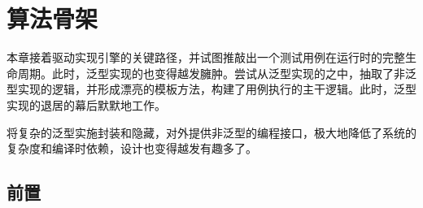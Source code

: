 \begin{savequote}[45mm]
\end{savequote}

\chapter{算法骨架} 
\label{ch:skeleton}

\begin{content}

本章接着驱动实现引擎的关键路径，并试图推敲出一个测试用例在运行时的完整生命周期。此时，泛型实现的也变得越发臃肿。尝试从泛型实现的之中，抽取了非泛型实现的逻辑，并形成漂亮的模板方法，构建了用例执行的主干逻辑。此时，泛型实现的退居的幕后默默地工作。

将复杂的泛型实施封装和隐藏，对外提供非泛型的编程接口，极大地降低了系统的复杂度和编译时依赖，设计也变得越发有趣多了。

\end{content}

\section{前置}

